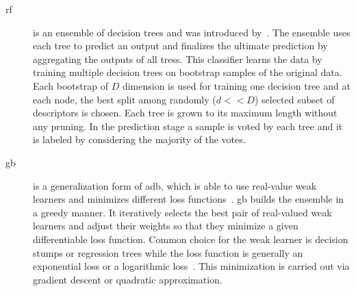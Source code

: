 \begin{description}
\item[\acl{rf}] is an ensemble of decision trees and was introduced by~\cite{breiman2001random}.
The ensemble uses each tree to predict an output and finalizes the ultimate prediction by aggregating the outputs of all tress. 
This classifier learns the data by training multiple decision trees on bootstrap samples of the original data. 
Each bootstrap of $D$ dimension is used for training one decision tree and at each node, the best split among randomly ($d << D$) selected subset of descriptors is chosen. 
Each tree is grown to its maximum length without any pruning. 
In the prediction stage a sample is voted by each tree and it is labeled by considering the majority of the votes.\\

\item[\acl{gb}] is a generalization form of \ac{adb}, which is able to use real-value weak learners and minimizes different loss functions~\cite{zheng2007general}.
\ac{gb} builds the ensemble in a greedy manner. 
It iteratively selects the best pair of real-valued weak learners and adjust their weights so that they minimize a given differentiable loss function.
Common choice for the weak learner is decision stumps or regression trees while the loss function is generally an exponential loss or a logarithmic loss~\cite{becker2013supervised}. 
This minimization is carried out via gradient descent or quadratic approximation.\\


\end{description}
